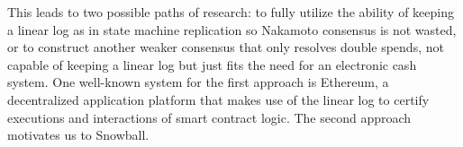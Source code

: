 This leads to two possible paths of research: to fully utilize the ability
of keeping a linear log as in state machine replication so Nakamoto consensus is
not wasted, or to construct another weaker consensus that only resolves double
spends, not capable of keeping a linear log but just fits the need for an
electronic cash system. One well-known system for the first approach is
Ethereum, a decentralized application platform that makes use of the linear log
to certify executions and interactions of smart contract logic. The second approach motivates us
to Snowball.


